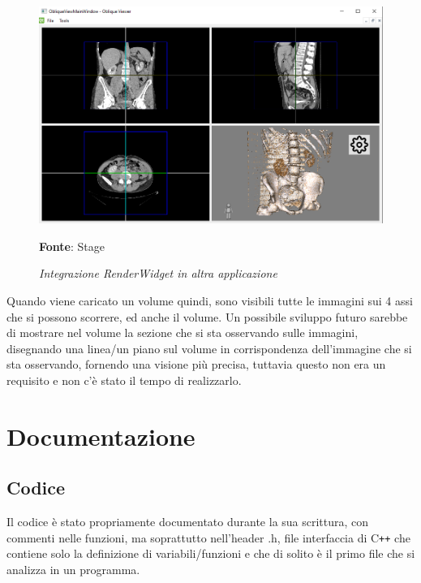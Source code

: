 \begin{figure}[h]
    \centering
    \includegraphics[width=1\textwidth]{immagini/svolgimento/obliqueview.png}
    \caption{\textit{Integrazione RenderWidget in altra applicazione}}
    \textbf{Fonte}: Stage
    \label{fig: Porting RenderWidget}
\end{figure}

Quando viene caricato un volume quindi, sono visibili tutte le immagini sui 4 assi che si possono scorrere, ed anche il volume. Un possibile sviluppo futuro sarebbe di mostrare nel volume la sezione che si sta osservando sulle immagini, disegnando una linea/un piano sul volume in corrispondenza dell'immagine che si sta osservando, fornendo una visione più precisa, tuttavia questo non era un requisito e non c'è stato il tempo di realizzarlo.

\section{Documentazione}
\subsection{Codice}
Il codice è stato propriamente documentato durante la sua scrittura, con commenti nelle funzioni, ma soprattutto nell'header .h, file interfaccia di C\texttt{++} che contiene solo la definizione di variabili/funzioni e che di solito è il primo file che si analizza in un programma.


